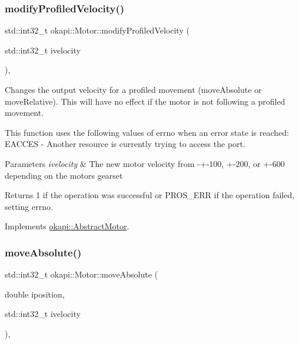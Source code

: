 \subsubsection{\texorpdfstring{modifyProfiledVelocity()}{modifyProfiledVelocity()}}
{\footnotesize\ttfamily std\+::int32\+\_\+t okapi\+::\+Motor\+::modify\+Profiled\+Velocity (\begin{DoxyParamCaption}\item[{std\+::int32\+\_\+t}]{ivelocity }\end{DoxyParamCaption})\hspace{0.3cm}{\ttfamily [override]}, {\ttfamily [virtual]}}

Changes the output velocity for a profiled movement (move\+Absolute or move\+Relative). This will have no effect if the motor is not following a profiled movement.

This function uses the following values of errno when an error state is reached\+: E\+A\+C\+C\+ES -\/ Another resource is currently trying to access the port.


\begin{DoxyParams}{Parameters}
{\em ivelocity} & The new motor velocity from -\/+-\/100, +-\/200, or +-\/600 depending on the motor\textquotesingle{}s gearset \\
\hline
\end{DoxyParams}
\begin{DoxyReturn}{Returns}
1 if the operation was successful or P\+R\+O\+S\+\_\+\+E\+RR if the operation failed, setting errno. 
\end{DoxyReturn}


Implements \mbox{\hyperlink{classokapi_1_1AbstractMotor_a1d131cbf0b8a325a54034e540c3be6d2}{okapi\+::\+Abstract\+Motor}}.

\mbox{\label{classokapi_1_1Motor_a5f95fd5864805b57f16fa5defdbf1968}} 
\subsubsection{\texorpdfstring{moveAbsolute()}{moveAbsolute()}}
{\footnotesize\ttfamily std\+::int32\+\_\+t okapi\+::\+Motor\+::move\+Absolute (\begin{DoxyParamCaption}\item[{double}]{iposition,  }\item[{std\+::int32\+\_\+t}]{ivelocity }\end{DoxyParamCaption})\hspace{0.3cm}{\ttfamily [override]}, {\ttfamily [virtual]}}

